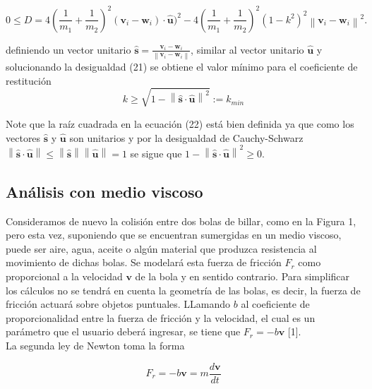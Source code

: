 \documentclass{article}
\newcommand{\norm}[1]{\left\lVert#1\right\rVert}
\begin{document}
\begin{equation}
   0\leq D = 4\left(\frac{1}{m_1}+\frac{1}{m_2}\right)^2(\textbf{v}_{i}-\textbf{w}_{i})\cdot \hat{\textbf{u}})^2- 4\left(\frac{1}{m_1}+\frac{1}{m_2}\right)^2(1-k^2)^2\norm{\textbf{v}_{i}-\textbf{w}_{i}}^2.
\end{equation}

 definiendo un vector unitario $\hat{\textbf{s}}=\frac{\textbf{v}_{i}-\textbf{w}_{i}}{\norm{\textbf{v}_{i}-\textbf{w}_{i}}}$, similar al vector unitario $\hat{\textbf{u}}$ y solucionando la desigualdad (21) se obtiene el valor mínimo para el coeficiente de restitución 
 \begin{equation}
     k\geq \sqrt{1-\norm{\hat{\textbf{s}}\cdot \hat{\textbf{u}}}^2}:=k_{min}
 \end{equation}
 
 Note que la raíz cuadrada en la ecuación (22) está bien definida ya que como los vectores $\hat{\textbf{s}}$ y $\hat{\textbf{u}}$ son unitarios y por la desigualdad de Cauchy-Schwarz $\norm{\hat{\textbf{s}}\cdot \hat{\textbf{u}}}\leq \norm{\hat{\textbf{s}}}\norm{\hat{\textbf{u}}}=1$ se sigue que $1-\norm{\hat{\textbf{s}}\cdot \hat{\textbf{u}}}^2\geq 0$.
 
 \subsection{Análisis con medio viscoso}
 
 Consideramos de nuevo la colisión entre dos bolas de billar, como en la Figura 1, pero esta vez, suponiendo que se encuentran sumergidas en un medio viscoso, puede ser aire, agua, aceite o algún material que produzca resistencia al movimiento de dichas bolas. Se modelará esta fuerza de fricción $\textbf{$F_r$}$ como proporcional a la velocidad $\textbf{v}$ de la bola y en sentido contrario. Para simplificar los cálculos no se tendrá en cuenta la geometría de las bolas, es decir, la fuerza de fricción actuará sobre objetos puntuales. LLamando $b$ al coeficiente de proporcionalidad entre la fuerza de fricción y la velocidad, el cual es un parámetro que el usuario deberá ingresar, se tiene que $ \textbf{$F_r$}= -b \textbf{v}$ [1].\\
 
 La segunda ley de Newton toma la forma
 
 \begin{equation}
 \textbf{$F_r$}= -b \textbf{v} = m \frac{d  \textbf{v}}{dt}
 \end{equation}
 
\end{document}
